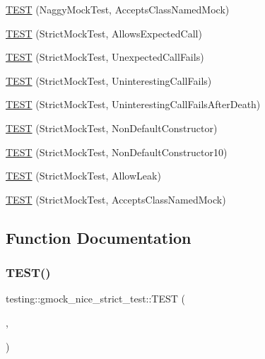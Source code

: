 \begin{DoxyCompactItemize}
\item 
\mbox{\hyperlink{namespacetesting_1_1gmock__nice__strict__test_af147980581baec3cf492457c2d1e0276}{T\+E\+ST}} (Naggy\+Mock\+Test, Accepts\+Class\+Named\+Mock)
\item 
\mbox{\hyperlink{namespacetesting_1_1gmock__nice__strict__test_a269b7756fb785a84a609543700f77256}{T\+E\+ST}} (Strict\+Mock\+Test, Allows\+Expected\+Call)
\item 
\mbox{\hyperlink{namespacetesting_1_1gmock__nice__strict__test_ae58ab074e0f9218a727d1fec0793667e}{T\+E\+ST}} (Strict\+Mock\+Test, Unexpected\+Call\+Fails)
\item 
\mbox{\hyperlink{namespacetesting_1_1gmock__nice__strict__test_afea105507ce78fc0e2c20d9f4cca16d7}{T\+E\+ST}} (Strict\+Mock\+Test, Uninteresting\+Call\+Fails)
\item 
\mbox{\hyperlink{namespacetesting_1_1gmock__nice__strict__test_a04e9402fd03549e1eda88659b6eac174}{T\+E\+ST}} (Strict\+Mock\+Test, Uninteresting\+Call\+Fails\+After\+Death)
\item 
\mbox{\hyperlink{namespacetesting_1_1gmock__nice__strict__test_a21456158013d707a1238d0ade00ea3f6}{T\+E\+ST}} (Strict\+Mock\+Test, Non\+Default\+Constructor)
\item 
\mbox{\hyperlink{namespacetesting_1_1gmock__nice__strict__test_ae52f11a6045e9c307237cf02b85e6b79}{T\+E\+ST}} (Strict\+Mock\+Test, Non\+Default\+Constructor10)
\item 
\mbox{\hyperlink{namespacetesting_1_1gmock__nice__strict__test_a5f8498b9a90a81c4709b8d3ae968500e}{T\+E\+ST}} (Strict\+Mock\+Test, Allow\+Leak)
\item 
\mbox{\hyperlink{namespacetesting_1_1gmock__nice__strict__test_a4534bdd7c8ca19aad56933d34e0ea4db}{T\+E\+ST}} (Strict\+Mock\+Test, Accepts\+Class\+Named\+Mock)
\end{DoxyCompactItemize}


\subsection{Function Documentation}
\mbox{\label{namespacetesting_1_1gmock__nice__strict__test_a12b9f686345faa5a646da65a67c38a44}} 
\subsubsection{\texorpdfstring{TEST()}{TEST()}\hspace{0.1cm}{\footnotesize\ttfamily [1/21]}}
{\footnotesize\ttfamily testing\+::gmock\+\_\+nice\+\_\+strict\+\_\+test\+::\+T\+E\+ST (\begin{DoxyParamCaption}\item[{Nice\+Mock\+Test}]{,  }\item[{Allows\+Expected\+Call}]{ }\end{DoxyParamCaption})}

